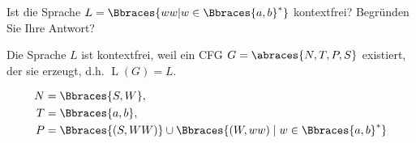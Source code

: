 
\begin{exercise}

Ist die Sprache $L = \Bbraces{w w | w \in \Bbraces{a, b}^\ast}$ kontextfrei?
Begründen Sie Ihre Antwort?

\end{exercise}


\begin{solution}

Die Sprache $L$ ist kontextfrei, weil ein CFG $G = \abraces{N, T, P, S}$ existiert, der sie erzeugt, d.h. $\operatorname L(G) = L$.

\begin{align*}
    N & = \Bbraces{S, W}, \\
    T & = \Bbraces{a, b}, \\
    P & = \Bbraces{(S, WW)} \cup \Bbraces{(W, ww) \mid w \in \Bbraces{a, b}^\ast}
\end{align*}

\end{solution}

